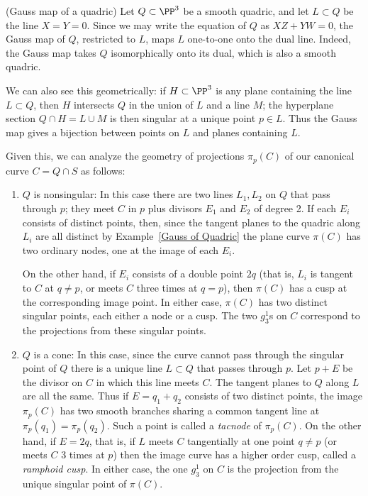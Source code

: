 \begin{example} (Gauss map of a quadric)\label{Gauss of Quadric}
 Let $Q\subset \PP^3$ be a smooth quadric, and let $L\subset Q$ be the line $X=Y =0$. Since we may write the equation of $Q$ as $XZ+YW = 0$, the Gauss map of $Q$, restricted to $L$, maps $L$ one-to-one onto the dual line. Indeed, the Gauss map takes $Q$ isomorphically onto its dual, which is also a smooth quadric.
 
 We can also see this geometrically: if $H \subset \PP^3$ is any plane containing the line $L \subset Q$, then $H$ intersects $Q$ in the union of $L$ and a line $M$; the hyperplane section $Q \cap H = L \cup M$ is then singular at a unique point $p \in L$. Thus the Gauss map gives a bijection between points on $L$ and planes containing $L$. 
\end{example}

Given this, we can analyze the geometry of projections $\pi_p(C)$ of our canonical curve $C = Q \cap S$ as follows:

\begin{enumerate}
\item $Q$ is nonsingular:
In this case there are two lines $L_1, L_2$ on $Q$ that pass through $p$; they meet $C$ in $p$ plus divisors $E_1$ and $E_2$ of degree 2. If each $E_i$ consists of distinct points, then, since the tangent planes to the quadric along $L_i$ are all distinct by Example~\ref{Gauss of Quadric} the plane curve $\pi(C)$ has two ordinary nodes, one at the image of each $E_i$.

On the other hand, if $E_i$ consists of a double point $2q$ (that is, $L_i$ is tangent to $C$ at $q\neq p$, or meets $C$ three times at $q = p$), then $\pi(C)$ has a cusp at the corresponding image point. 
In either case, $\pi(C)$ has two distinct singular points, each either a node or a cusp. The two $g^1_3$s on $C$ correspond to the projections from these singular points.

\item $Q$ is a cone:
In this case, since the curve cannot pass through the singular point of $Q$ there is a unique line $L\subset Q$ that passes through $p$. Let $p+E$ be the divisor on $C$ in which this line meets $C$. The tangent planes to $Q$ along $L$ are all the same. Thus if $E = q_1+q_2$ consists of two distinct points, the image $\pi_p(C)$ has two smooth branches sharing a common tangent line at
$\pi_p(q_1) = \pi_p(q_2)$. Such a point is called a \emph{tacnode} of $\pi_p(C)$. On the other hand, if $E= 2q$, that is, if $L$ meets $C$ tangentially at one point $q\neq p$ (or meets $C$ 3 times at $p$) then the image curve has a higher order cusp, called a \emph{ramphoid cusp}. In either case, the one $g^1_3$ on $C$ is the projection from the unique singular point of $\pi(C)$.
\end{enumerate}

